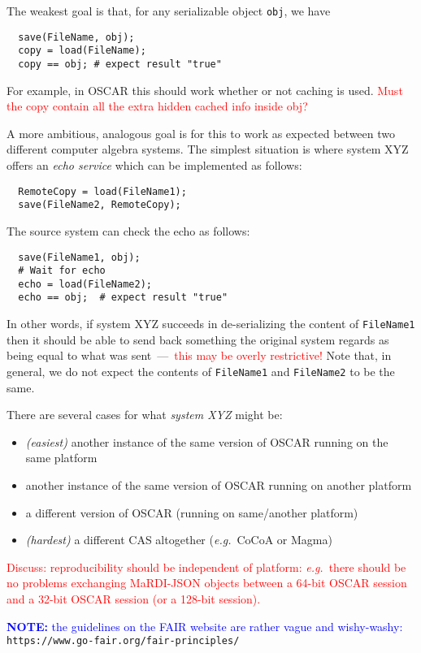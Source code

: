\documentclass{article}
\newcommand{\MaRDIJSON}{MaRDI-JSON}
\newcommand \eg {\textit{e.g.}}
\def\red#1{\textcolor{red}{#1}}
\def\blue#1{\textcolor{blue}{#1}}
\begin{document}
The weakest goal is that, for any serializable object \verb|obj|, we have
\begin{verbatim}
  save(FileName, obj);
  copy = load(FileName);
  copy == obj; # expect result "true"
\end{verbatim}
For example, in OSCAR this should work whether or not caching is used.
\red{Must the copy contain all the extra hidden cached info inside obj?}

A more ambitious, analogous goal is for this to work as expected between
two different computer algebra systems.  The simplest situation is where
system XYZ offers an \textit{echo service} which can be implemented as follows:
\begin{verbatim}
  RemoteCopy = load(FileName1);
  save(FileName2, RemoteCopy);
\end{verbatim}
The source system can check the echo as follows:
\begin{verbatim}
  save(FileName1, obj);
  # Wait for echo
  echo = load(FileName2);
  echo == obj;  # expect result "true"
\end{verbatim}
In other words, if system XYZ succeeds in de-serializing the content
of \verb|FileName1| then it should be able to send back something the
original system regards as being equal to what was sent~---~\red{this
  may be overly restrictive!}  Note that, in general, we do not expect
the contents of \verb|FileName1| and \verb|FileName2| to be the same.

There are several cases for what \textit{system XYZ} might be:
\begin{itemize}
\item \textit{(easiest)} another instance of the same version of OSCAR running on the same platform
\item another instance of the same version of OSCAR running on another platform
\item a different version of OSCAR (running on same/another platform)
\item \textit{(hardest)} a different CAS altogether (\eg~CoCoA or Magma)
\end{itemize}

\red{Discuss: reproducibility should be independent of platform:
  \eg~there should be no problems exchanging {\MaRDIJSON} objects
  between a 64-bit OSCAR session and a 32-bit OSCAR session (or a
  128-bit session).}


\blue{\textbf{NOTE:} the guidelines on the FAIR website are rather vague and wishy-washy:}\\
\verb|https://www.go-fair.org/fair-principles/|
\end{document}
